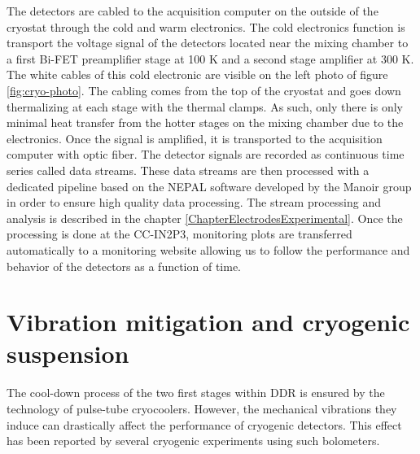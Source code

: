 The detectors are cabled to the acquisition computer on the outside of the cryostat through the cold and warm electronics. The cold electronics function is transport the voltage signal of the detectors located near the mixing chamber to a first Bi-FET preamplifier stage at 100 K and a second stage amplifier at 300 K.
The white cables of this cold electronic are visible on the left photo of figure \ref{fig:cryo-photo}. The cabling comes from the top of the cryostat and goes down thermalizing at each stage with the thermal clamps. As such, only there is only minimal heat transfer from the hotter stages  on the mixing chamber due to the electronics.
Once the signal is amplified, it is transported to the acquisition computer with optic fiber. The detector signals are recorded as continuous time series called data streams. These data streams are then processed with a dedicated pipeline based on the NEPAL software developed by the Manoir group in order to ensure high quality data processing. The stream processing and analysis is described in the chapter \ref{ChapterElectrodesExperimental}. Once the processing is done at the CC-IN2P3, monitoring plots are transferred automatically to a monitoring website allowing us to follow the performance and behavior of the detectors as a function of time.



\section{Vibration mitigation and cryogenic suspension}
\label{sec:suspended-tower}

The cool-down process of the two first stages within DDR is ensured by the technology of pulse-tube cryocoolers. However, the mechanical vibrations they induce can drastically affect the performance of cryogenic detectors. This effect has been reported by several cryogenic experiments using such bolometers.

